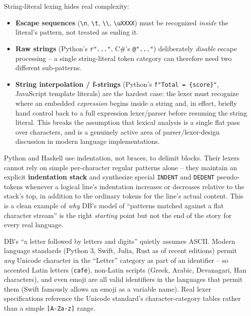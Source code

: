 \documentclass[11pt]{article}
\begin{document}
\begin{enrichment}
String-literal lexing hides real complexity:
\begin{itemize}
  \item \textbf{Escape sequences} (\texttt{\textbackslash n}, \texttt{\textbackslash t},
  \texttt{\textbackslash\textbackslash}, \texttt{\textbackslash uXXXX}) must be recognized
  \emph{inside} the literal's pattern, not treated as ending it.
  \item \textbf{Raw strings} (Python's \texttt{r"..."}, C\#'s \texttt{@"..."}) deliberately
  \emph{disable} escape processing -- a single string-literal token category can therefore need
  two different sub-patterns.
  \item \textbf{String interpolation / f-strings} (Python's \texttt{f"Total = \{score\}"},
  JavaScript template literals) are the hardest case: the lexer must recognize where an embedded
  \emph{expression} begins inside a string and, in effect, briefly hand control back to a
  full expression lexer/parser before resuming the string literal. This breaks the assumption
  that lexical analysis is a single flat pass over characters, and is a genuinely active area of
  parser/lexer-design discussion in modern language implementations.
\end{itemize}
\end{enrichment}

\begin{enrichment}
Python and Haskell use indentation, not braces, to delimit blocks. Their lexers cannot rely on
simple per-character regular patterns alone -- they maintain an explicit \textbf{indentation
stack} and synthesize special \texttt{INDENT} and \texttt{DEDENT} pseudo-tokens whenever a
logical line's indentation increases or decreases relative to the stack's top, in addition to
the ordinary tokens for the line's actual content. This is a clean example of \emph{why} DB's
model of ``patterns matched against a flat character stream'' is the right \emph{starting}
point but not the end of the story for every real language.
\end{enrichment}

\begin{enrichment}
DB's ``a letter followed by letters and digits'' quietly assumes ASCII. Modern language
standards (Python 3, Swift, Julia, Rust as of recent editions) permit \emph{any} Unicode
character in the ``Letter'' category as part of an identifier -- so accented Latin letters
(\texttt{caf\'e}), non-Latin scripts (Greek, Arabic, Devanagari, Han characters), and even emoji
are all valid identifiers in the languages that permit them (Swift famously allows an emoji as a
variable name). Real lexer specifications reference the Unicode standard's character-category
tables rather than a simple \texttt{[A-Za-z]} range.
\end{enrichment}
\end{document}
